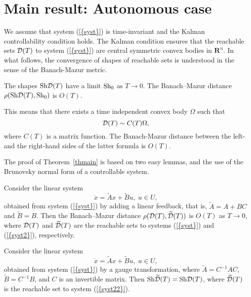 \documentclass[final]{siamltex}
\begin{document}
\section{Main result: Autonomous case}

We assume that system {(\ref{{syst}})} is time-invariant and the Kalman
controllability condition holds. The Kalman condition ensures that the
reachable sets ${\cal D} (T)$ to system {(\ref{{syst}})} are central symmetric
convex bodies in ${{\mathbf R}}^n$. In what follows, the convergence of 
shapes of reachable sets is understood in the sense of the Banach-Mazur metric.
\begin{theorem}\label{thmain} \iffalse Assume that {(\ref{{syst}})} is an autonomous system such that $U$ is
central symmetric, and the Kalman controllability holds.  Then, \fi The shapes ${\mathop{\rm Sh}\nolimits}{\cal D} (T)$
have a limit ${\mathop{\rm Sh}\nolimits}_0 $ as $T\to 0$. The Banach--Mazur distance $\rho({\mathop{\rm Sh}\nolimits}{\cal D} (T),{\mathop{\rm Sh}\nolimits}_0 )$ is
$O(T)$.
\end{theorem}

\noindent This means that there exists a time independent convex body $\Omega$ such that 
$${\cal D} (T)\sim C(T)\Omega,$$ where $C(T)$ is a matrix function. The Banach-Mazur distance between the left- and
the right-hand sides of the latter formula is $O(T)$.

The proof of Theorem~\ref{thmain} is based on two easy lemmas, and the use of
the Brunovsky normal form of a controllable system.
\begin{lemma} \label{linear_feedback}
Consider the linear system
\begin{equation}\label{syst2}
\dot x={\widetilde A}x+{\widetilde B}u, 
\; u\in U,
\end{equation}
obtained from system {\rm {(\ref{{syst}})}} by adding a linear feedback, that is, ${\widetilde A}=A+BC$
and ${\widetilde B}=B$. Then the Banach--Mazur distance $\rho({\cal D} (T),\widetilde{\cal D} (T))$
is $O({T})$ as $T\to0$, where ${\cal D} (T)$ and $\widetilde{\cal D} (T)$ are the reachable sets to
systems {\rm {(\ref{{syst}})}} and {\rm {(\ref{{syst2}})}}, respectively.
\end{lemma}

\begin{lemma} \label{gauge}
Consider the linear system
\begin{equation}\label{syst22}
\dot x={\widetilde A}x+{\widetilde B}u, 
\; u\in U, 
\end{equation}
obtained from system {\rm {(\ref{{syst}})}} by a gauge transformation, where ${\widetilde A}=C^{-1}AC$,
${\widetilde B}=C^{-1}B$, and $C$ is an invertible matrix.  Then ${\mathop{\rm Sh}\nolimits}\widetilde{\cal D} (T)={\mathop{\rm Sh}\nolimits}{\cal
D} (T)$, where $\widetilde{\cal D} (T)$ is the reachable set to system {\rm {(\ref{{syst22}})}}.
\end{lemma}
\end{document}
